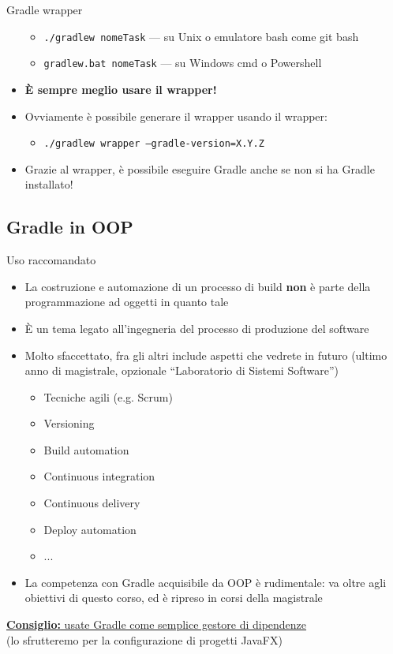 \documentclass[xcolor=dvipsnames,presentation]{beamer}
\begin{document}
\begin{frame}[allowframebreaks]{Gradle wrapper}
\begin{itemize}
        \begin{itemize}
            \item \texttt{./gradlew nomeTask} --- su Unix o emulatore bash come git bash
            \item \texttt{gradlew.bat nomeTask} --- su Windows cmd o Powershell
        \end{itemize}
        \item \textbf{È sempre meglio usare il wrapper!}
        \item Ovviamente è possibile generare il wrapper usando il wrapper:
        \begin{itemize}
            \item \texttt{./gradlew wrapper --gradle-version=X.Y.Z}
        \end{itemize}
        \item Grazie al wrapper, è possibile eseguire Gradle anche se non si ha Gradle installato!
    \end{itemize}
\end{frame}

\subsection{Gradle in OOP}

\begin{frame}[fragile]{Uso raccomandato}
    \begin{itemize}
        \item La costruzione e automazione di un processo di build \textbf{non} è parte della programmazione ad oggetti in quanto tale
        \item È un tema legato all'ingegneria del processo di produzione del software
        \item Molto sfaccettato, fra gli altri include aspetti che vedrete in futuro
        {\small(ultimo anno di magistrale, opzionale ``Laboratorio di Sistemi Software'')}
        \begin{itemize}
            \item Tecniche agili (e.g. Scrum)
            \item Versioning
            \item Build automation
            \item Continuous integration
            \item Continuous delivery
            \item Deploy automation
            \item ...
        \end{itemize}
        \item La competenza con Gradle acquisibile da OOP è rudimentale: va oltre agli obiettivi di questo corso, ed è ripreso in corsi della magistrale
    \end{itemize}
    \begin{center}
        \underline{\textbf{Consiglio:} usate Gradle come semplice gestore di dipendenze}\\(lo sfrutteremo per la configurazione di progetti JavaFX)
    \end{center}
\end{frame}
\end{document}

